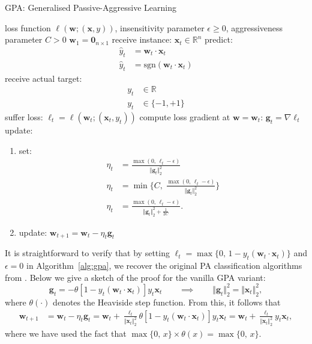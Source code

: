 \begin{algorithm}[H]
\caption{GPA: Generalised Passive-Aggressive Learning}
\label{alg:gpa}
\begin{algorithmic}[1]
	 loss function $\ell(\mathbf{w}; (\mathbf{x}, y))$, insensitivity parameter $\epsilon \geq 0$, aggressiveness parameter $C > 0$
	 $\mathbf{w}_1 = \mathbf{0}_{n\times 1}$
		\STATE receive instance: $\mathbf{x}_t \in \mathbb{R}^n$
		\STATE predict:
		\begin{align*}
			\hat{y}_t
			&= \mathbf{w}_t\cdot\mathbf{x}_t
			\nonumber \tag{regression} \\
			\hat{y}_t
			&= \mathrm{sgn}(\mathbf{w}_t\cdot\mathbf{x}_t) \tag{classification}
		\end{align*}
		\STATE receive actual target:
		\begin{align*}
			y_t &\in \mathbb{R}
			\nonumber \tag{regression} \\
			y_t &\in \{-1, +1\} \tag{classification}
		\end{align*}
		\STATE suffer loss: $\ell_t = \ell(\mathbf{w}_t; (\mathbf{x}_t, y_t))$
		\STATE compute loss gradient at $\mathbf{w} = \mathbf{w}_t$: $\mathbf{g}_t = \nabla\ell_t$
		\STATE update:
		\begin{enumerate}
		\item set:
\begin{align*}
	\eta_t
	&= \frac{\max(0,\,\ell_t - \epsilon)}{\Vert\mathbf{g}_t\Vert_2^2}
	\nonumber \tag{GPA} \\
	\eta_t
	&= \min\bigg\{C, \; \frac{\max(0,\,\ell_t - \epsilon)}{\Vert\mathbf{g}_t\Vert_2^2}\bigg\}
	\nonumber \tag{GPA-I} \\
	\eta_t
	&= \frac{\max(0,\,\ell_t - \epsilon)}{\Vert\mathbf{g}_t\Vert_2^2 + \frac{1}{2C}}
	\tag{GPA-II}.
\end{align*}
		\item update: $\mathbf{w}_{t+1} = \mathbf{w}_t - \eta_t\mathbf{g}_t$
		\end{enumerate}
	\ENDFOR
\end{algorithmic}
\end{algorithm}
It is straightforward to verify that by setting $\ell_t = \max\{0,\, 1 - y_t(\mathbf{w}_t\cdot\mathbf{x}_t)\}$ and $\epsilon = 0$ in Algorithm~\ref{alg:gpa}, we recover the original PA classification algorithms from \citep{crammer06}. Below we give a sketch of the proof for the vanilla GPA variant:
\begin{equation}
	\mathbf{g}_t = -\theta[1 - y_t(\mathbf{w}_t\cdot\mathbf{x}_t)]y_{t}\mathbf{x}_t
	\qquad \implies \qquad
	\Vert\mathbf{g}_t\Vert_2^2 = \Vert\mathbf{x}_t\Vert_2^2,
\end{equation}
where $\theta(\cdot)$ denotes the Heaviside step function. From this, it follows that
\begin{align}
	\mathbf{w}_{t+1} &= \mathbf{w}_t - \eta_t\mathbf{g}_t
	= \mathbf{w}_t + \frac{\ell_t}{\Vert\mathbf{x}_t\Vert_2^2}\theta[1 - y_t(\mathbf{w}_t\cdot\mathbf{x}_t)]y_{t}\mathbf{x}_t
	= \mathbf{w}_t + \frac{\ell_t}{\Vert\mathbf{x}_t\Vert_2^2}y_{t}\mathbf{x}_t,
\end{align}
where we have used the fact that $\max\{0,\, x\} \times \theta(x) = \max\{0,\, x\}$.

